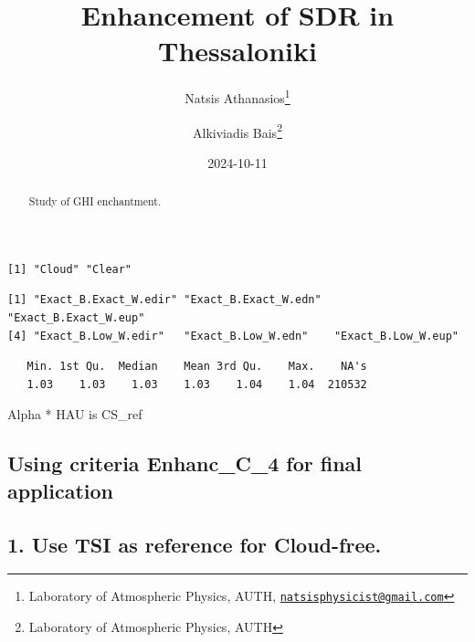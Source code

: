 \documentclass[
  10pt,
  a4paper,oneside]{article}
\title{Enhancement of SDR in Thessaloniki}
\author{Natsis Athanasios\footnote{Laboratory of Atmospheric Physics, AUTH, \href{mailto:natsisphysicist@gmail.com}{\nolinkurl{natsisphysicist@gmail.com}}} \and Alkiviadis Bais\footnote{Laboratory of Atmospheric Physics, AUTH}}
\date{2024-10-11}
\begin{document}
\maketitle
\begin{abstract}
Study of GHI enchantment.
\end{abstract}

{
\hypersetup{linkcolor=}
\setcounter{tocdepth}{4}
\tableofcontents
}
\begin{verbatim}
[1] "Cloud" "Clear"
\end{verbatim}

\begin{verbatim}
[1] "Exact_B.Exact_W.edir" "Exact_B.Exact_W.edn"  "Exact_B.Exact_W.eup" 
[4] "Exact_B.Low_W.edir"   "Exact_B.Low_W.edn"    "Exact_B.Low_W.eup"   
\end{verbatim}

\begin{verbatim}
   Min. 1st Qu.  Median    Mean 3rd Qu.    Max.    NA's 
   1.03    1.03    1.03    1.03    1.04    1.04  210532 
\end{verbatim}

Alpha * HAU is CS\_ref

\hypertarget{using-criteria-enhanc_c_4-for-final-application}{%
\subsection{\texorpdfstring{Using criteria \textbf{Enhanc\_C\_4} for final application}{Using criteria Enhanc\_C\_4 for final application}}\label{using-criteria-enhanc_c_4-for-final-application}}

\hypertarget{use-tsi-as-reference-for-cloud-free.}{%
\subsection{1. Use TSI as reference for Cloud-free.}\label{use-tsi-as-reference-for-cloud-free.}}
\end{document}
